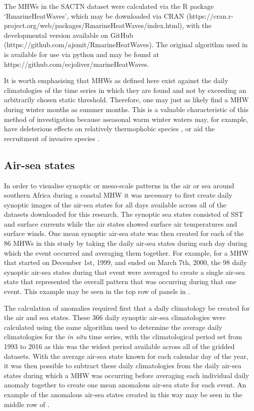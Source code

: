 \documentclass[a4paper,10pt,review]{elsarticle}
\begin{document}
The MHWs in the SACTN dataset were calculated via the R package `RmarineHeatWaves', which may be downloaded via CRAN (https://cran.r-project.org/web/packages/RmarineHeatWaves/index.html), with the developmental version available on GitHub (https://github.com/ajsmit/RmarineHeatWaves). The original algorithm used in \citet{Hobday2016} is available for use via python and may be found at https://github.com/ecjoliver/marineHeatWaves.

It is worth emphasising that MHWs as defined here exist against the daily climatologies of the time series in which they are found and not by exceeding an arbitrarily chosen static threshold. Therefore, one may just as likely find a MHW during winter months as summer months. This is a valuable characteristic of this method of investigation because aseasonal warm winter waters may, for example, have deleterious effects on relatively thermophobic species \citep{Wernberg2011}, or aid the recruitment of invasive species \citep{Stachowicz2002}.

\subsection{Air-sea states}
In order to visualise synoptic or meso-scale patterns in the air or sea around southern Africa during a coastal MHW it was necessary to first create daily synoptic images of the air-sea states for all days available across all of the datasets downloaded for this research. The synoptic sea states consisted of SST and surface currents while the air states showed surface air temperatures and surface winds. One mean synoptic air-sea state was then created for each of the 86 MHWs in this study by taking the daily air-sea states during each day during which the event occurred and averaging them together. For example, for a MHW that started on December 1st, 1999, and ended on March 7th, 2000, the 98 daily synoptic air-sea states during that event were averaged to create a single air-sea state that represented the overall pattern that was occurring during that one event. This example may be seen in the top row of panels in . 

The calculation of anomalies required first that a daily climatology be created for the air and sea states. These 366 daily synoptic air-sea climatologies were calculated using the same algorithm used to determine the average daily climatologies for the \emph{in situ} time series, with the climatological period set from 1993 to 2016 as this was the widest period available across all of the gridded datasets. With the average air-sea state known for each calendar day of the year, it was then possible to subtract these daily climatologies from the daily air-sea states during which a MHW was occurring before averaging each individual daily anomaly together to create one mean anomalous air-sea state for each event. An example of the anomalous air-sea states created in this way may be seen in the middle row of .
\end{document}
